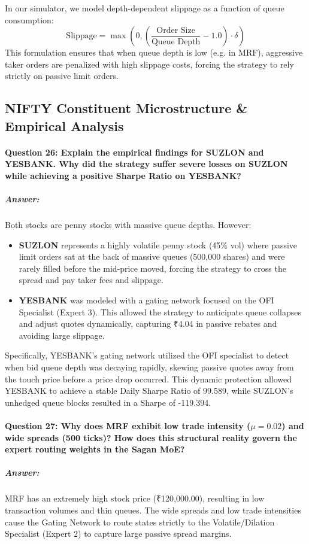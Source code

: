 \documentclass[11pt,a4paper]{article}
\begin{document}
In our simulator, we model depth-dependent slippage as a function of queue consumption:
\begin{equation}
    \text{Slippage} = \max\left( 0, \left( \frac{\text{Order Size}}{\text{Queue Depth}} - 1.0 \right) \cdot \delta \right)
\end{equation}
This formulation ensures that when queue depth is low (e.g. in MRF), aggressive taker orders are penalized with high slippage costs, forcing the strategy to rely strictly on passive limit orders.

\subsection{NIFTY Constituent Microstructure & Empirical Analysis}

\paragraph{Question 26: Explain the empirical findings for SUZLON and YESBANK. Why did the strategy suffer severe losses on SUZLON while achieving a positive Sharpe Ratio on YESBANK?}
\subparagraph{Answer:}
Both stocks are penny stocks with massive queue depths. However:
\begin{itemize}
    \item \textbf{SUZLON} represents a highly volatile penny stock (45\% vol) where passive limit orders sat at the back of massive queues (500,000 shares) and were rarely filled before the mid-price moved, forcing the strategy to cross the spread and pay taker fees and slippage.
    \item \textbf{YESBANK} was modeled with a gating network focused on the OFI Specialist (Expert 3). This allowed the strategy to anticipate queue collapses and adjust quotes dynamically, capturing ₹4.04 in passive rebates and avoiding large slippage.
\end{itemize}

Specifically, YESBANK's gating network utilized the OFI specialist to detect when bid queue depth was decaying rapidly, skewing passive quotes away from the touch price before a price drop occurred. This dynamic protection allowed YESBANK to achieve a stable Daily Sharpe Ratio of 99.589, while SUZLON's unhedged queue blocks resulted in a Sharpe of -119.394.

\paragraph{Question 27: Why does MRF exhibit low trade intensity ($\mu = 0.02$) and wide spreads (500 ticks)? How does this structural reality govern the expert routing weights in the Sagan MoE?}
\subparagraph{Answer:}
MRF has an extremely high stock price (₹120,000.00), resulting in low transaction volumes and thin queues. The wide spreads and low trade intensities cause the Gating Network to route states strictly to the Volatile/Dilation Specialist (Expert 2) to capture large passive spread margins.
\end{document}
